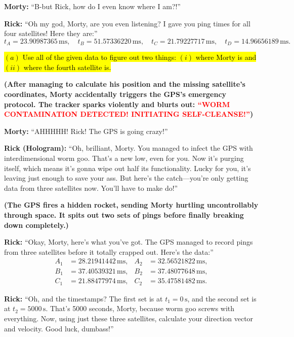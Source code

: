 \documentclass[a4paper, 12pt]{exam}
\begin{document}
\noindent \textbf{Morty:} “B-but Rick, how do I even know where I am?!” \bigskip

\noindent \textbf{Rick:} “Oh my god, Morty, are you even listening? I gave you ping times for all four satellites! Here they are:”
\[
t_A = 23.90987365 \, \text{ms}, \quad t_B = 51.57336220 \, \text{ms}, \quad t_C = 21.79227717 \, \text{ms}, \quad t_D = 14.96656189 \, \text{ms}.
\]

\hl{$(a)$ Use all of the given data to figure out two things: $(i)$ where Morty is and $(ii)$ where the fourth satellite is.}

\bigskip

\noindent \textbf{(After managing to calculate his position and the missing satellite’s coordinates, Morty accidentally triggers the GPS’s emergency protocol. The tracker sparks violently and blurts out: \textcolor{red}{“WORM CONTAMINATION DETECTED! INITIATING SELF-CLEANSE!”})}  \bigskip

\noindent \textbf{Morty:} “AHHHHH! Rick! The GPS is going crazy!”  \bigskip

\noindent \textbf{Rick (Hologram):} “Oh, brilliant, Morty. You managed to infect the GPS with interdimensional worm goo. That’s a new low, even for you. Now it’s purging itself, which means it’s gonna wipe out half its functionality. Lucky for you, it’s leaving just enough to save your ass. But here’s the catch—you’re only getting data from three satellites now. You’ll have to make do!”  \bigskip

\noindent \textbf{(The GPS fires a hidden rocket, sending Morty hurtling uncontrollably through space. It spits out two sets of pings before finally breaking down completely.)}  \bigskip

\noindent \textbf{Rick:} “Okay, Morty, here’s what you’ve got. The GPS managed to record pings from three satellites before it totally crapped out. Here’s the data:” 
\[
\begin{aligned}
A_1 &= 28.21941442 \, \text{ms}, & A_2 &= 32.56521822 \, \text{ms}, \\
B_1 &= 37.40539321 \, \text{ms}, & B_2 &= 37.48077648 \, \text{ms}, \\
C_1 &= 21.88477974 \, \text{ms}, & C_2 &= 35.47581482 \, \text{ms}.
\end{aligned}
\]

\noindent \textbf{Rick:} “Oh, and the timestamps? The first set is at \(t_1 = 0 \, \text{s}\), and the second set is at \(t_2 = 5000 \, \text{s}\). That’s 5000 seconds, Morty, because worm goo screws with everything. Now, using just these three satellites, calculate your direction vector and velocity. Good luck, dumbass!”
\bigskip
\end{document}

